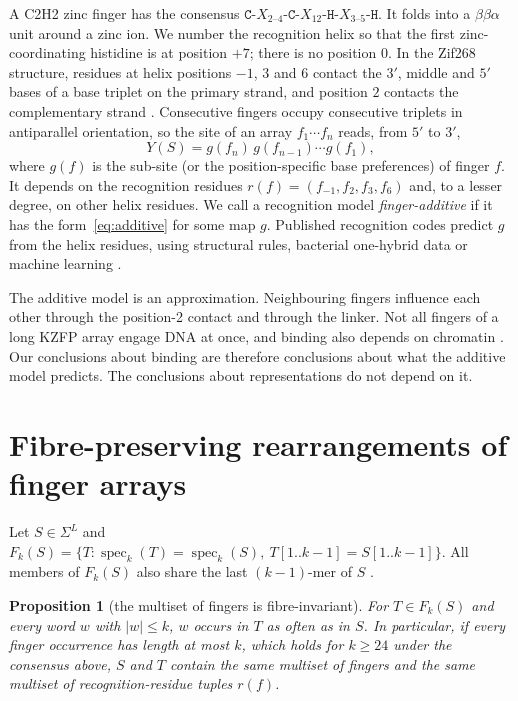 \documentclass[11pt]{article}
\theoremstyle{plain}
\newtheorem{proposition}[theorem]{Proposition}
\theoremstyle{definition}
\theoremstyle{remark}
\newcommand{\spec}{\operatorname{spec}}
\begin{document}
A C2H2 zinc finger has the consensus $\mathtt C$-$X_{2\text{--}4}$-$\mathtt C$-$X_{12}$-$\mathtt H$-$X_{3\text{--}5}$-$\mathtt H$.
It folds into a $\beta\beta\alpha$ unit around a zinc ion. We number the recognition helix so that the first
zinc-coordinating histidine is at position $+7$; there is no position $0$. In the Zif268 structure, residues at
helix positions $-1$, $3$ and $6$ contact the $3'$, middle and $5'$ bases of a base triplet on the primary strand,
and position $2$ contacts the complementary strand \cite{PavletichPabo91,Elrod96}. Consecutive fingers occupy
consecutive triplets in antiparallel orientation, so the site of an array $f_1\cdots f_n$ reads, from $5'$ to $3'$,
\begin{equation}\label{eq:additive}
Y(S)=g(f_n)\,g(f_{n-1})\cdots g(f_1),
\end{equation}
where $g(f)$ is the sub-site (or the position-specific base preferences) of finger $f$. It depends on the
recognition residues $r(f)=(f_{-1},f_2,f_3,f_6)$ and, to a lesser degree, on other helix residues. We call a
recognition model \emph{finger-additive} if it has the form~\eqref{eq:additive} for some map $g$. Published
recognition codes predict $g$ from the helix residues, using structural rules, bacterial one-hybrid data or
machine learning \cite{PersikovSingh14,Najafabadi15}.

The additive model is an approximation. Neighbouring fingers influence each other through the position-2
contact and through the linker. Not all fingers of a long KZFP array engage DNA at once, and binding also depends
on chromatin \cite{Wolfe00,Imbeault17}. Our conclusions about binding are therefore conclusions about what the
additive model predicts. The conclusions about representations do not depend on it.

\section{Fibre-preserving rearrangements of finger arrays}\label{sec:construction}

Let $S\in\Sigma^L$ and $F_k(S)=\{T:\spec_k(T)=\spec_k(S),\ T[1..k-1]=S[1..k-1]\}$. All members of $F_k(S)$ also share the
last $(k-1)$-mer of $S$ \cite{CC26c}.

\begin{proposition}[the multiset of fingers is fibre-invariant]\label{prop:multiset}
For $T\in F_k(S)$ and every word $w$ with $|w|\le k$, $w$ occurs in $T$ as often as in $S$. In particular, if every
finger occurrence has length at most $k$, which holds for $k\ge24$ under the consensus above, $S$ and $T$ contain
the same multiset of fingers and the same multiset of recognition-residue tuples $r(f)$.
\end{proposition}
\end{document}

